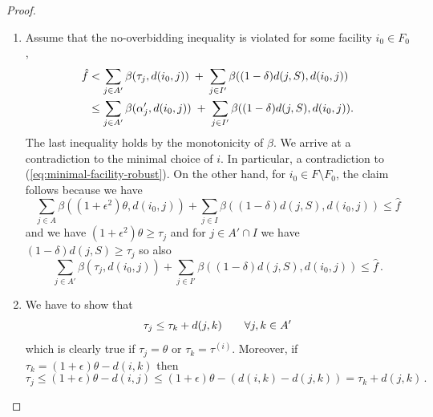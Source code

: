 \begin{proof}
\begin{enumerate}
\begin{align*}
        &= (1+\epsilon) \theta - (1-\eps)d(i, j)-(\gamma (1-\delta/2) + \eps) d(i, j)\\
        &\geq (1+\eps^2) \theta - (\gamma (1-\delta/2) + \eps)d(i,j)\\
        &\geq (1+\eps^2)\theta - \gamma d(i, j)\\
        &\geq \alpha_j' - \gamma d(i, j)\,.
    \end{align*}
        For $j \in A' \setminus B(i,\epsilon \theta)$, using that $\eps^2 \theta \le \epsilon \gamma \delta /2~\theta \le \gamma \delta/2~ d(i,j)$,
        \begin{align*}
            \beta(\alpha_j^\prime, d(i,j)) = \pos{\alpha_j^\prime - \gamma  d(i,j)} \le \pos{\theta - \gamma (1-\delta/2) d(i,j)} = \beta(\tau_j,  (1-\delta/2) d(i,j)).
        \end{align*}
        \item[\textbf{(iv)}] Assume that the no-overbidding inequality is violated for some facility $i_0 \in F_0$,
        \begin{align*}
            \hat f & < \sum_{j\in A'}\beta(\tau_j,d(i_0,j))
                  \;+\;
                  \sum_{j\in I'}\beta((1-\delta)  d(j,S), d(i_0,j))
                  \\ & \le \sum_{j\in A'} \beta(\alpha^\prime_j,d(i_0,j))
                  \;+\;
                  \sum_{j\in I'}\beta((1-\delta)  d(j,S), d(i_0,j)).
        \end{align*}
        The last inequality holds by the monotonicity of $\beta$.
        We arrive at a contradiction to the minimal choice of $i$. In particular, a contradiction to (\ref{eq:minimal-facility-robust}). 
        On the other hand, for $i_0 \in F \setminus F_0$, the claim follows because we have 
        \[
\sum_{j \in A} \beta((1+\epsilon^2)\theta, d(i_0,j)) + \sum_{j \in I} \beta((1-\delta)d(j, S), d(i_0,j)) \leq \hat f
    \]
        and we have $(1+\epsilon^2)\theta \geq \tau_j$ and for $j \in A' \cap I$ we have $(1-\delta)d(j, S) \geq \tau_j$ so also
        \[
\sum_{j \in A'} \beta(\tau_j, d(i_0,j)) + \sum_{j \in I'} \beta((1-\delta)d(j, S), d(i_0,j)) \leq \hat f\,.
    \]
        \item[\textbf{(v)}] We have to show that
              \[
                  \tau_j \le \tau_k + d(j,k)
                  \qquad \forall j,k\in A'
              \]
              which is clearly true if $\tau_j = \theta$ or $\tau_k = \tau^{(i)}$. Moreover, if $\tau_k = (1+\epsilon)\theta - d(i,k)$ then
              \[
                \tau_j \leq (1+\epsilon) \theta - d(i, j) \leq (1+\epsilon) \theta - (d(i, k) - d(j, k)) = \tau_k + d(j,k)\,.
\]
\end{enumerate}
\end{proof}
